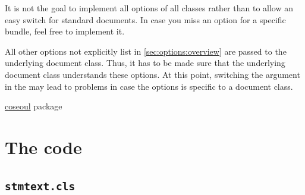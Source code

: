 \documentclass[%
  type=article,%
  layout=koma,%
  fleqn,%
  page=false,%
  cleveref=true,%
  conditionallox=true,%
  conditionalloxnewpage=true,%
  date=true,%
  glossaries=true,%
  hyperref=true,%
  index=true,%
  listings=true%
]{stmtext}
\begin{document}
It is not the goal to implement all options of all classes rather than to allow an easy switch for standard documents. In case you miss an option for a specific bundle, feel free to implement it.






% 


All other options not explicitly list in \cref{sec:options:overview} are passed to the underlying document class. Thus, it has to be made sure that the underlying document class understands these options. At this point, switching the argument in the  may lead to problems in case the options is specific to a document class.

\setcounter{currentlevel}{\basetoclevelnr}
\label{sec:usage}


\href{https://ctan.org/tex-archive/macros/latex/contrib/coseoul}{coseoul} package

\printstmacronyms

\printstmindex

\newpage
\appendix

\section{The code}

\subsection{\protect\texttt{stmtext.cls}}


\end{document}
